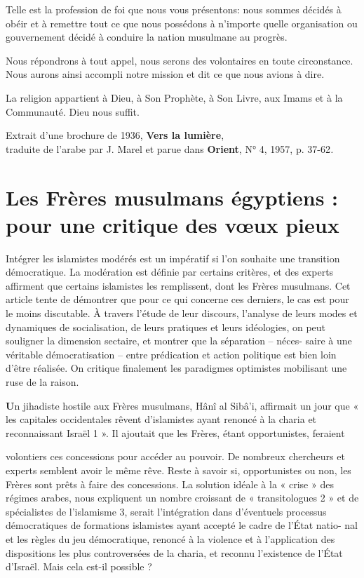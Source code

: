 Telle est la profession de foi que nous vous présentons: nous sommes
décidés à obéir et à remettre tout ce que nous possédons à n'importe
quelle organisation ou gouvernement décidé à conduire la nation
musulmane au progrès.

Nous répondrons à tout appel, nous serons des volontaires en toute
circonstance. Nous aurons ainsi accompli notre mission et dit ce que
nous avions à dire.

La religion appartient à Dieu, à Son Prophète, à Son Livre, aux Imams et
à la Communauté. Dieu nous suffit.

Extrait d'une brochure de 1936, \textbf{Vers la lumière},\\
traduite de l'arabe par J. Marel et parue dans \textbf{Orient}, N° 4,
1957, p. 37-62\emph{.}




\section{Les Frères musulmans égyptiens : pour une critique des vœux pieux}

 




Intégrer les islamistes modérés est un impératif si l'on souhaite une
transition démocratique. La modération est définie par certains
critères, et des experts affirment que certains islamistes les
remplissent, dont les Frères musulmans. Cet article tente de démontrer
que pour ce qui concerne ces derniers, le cas est pour le moins
discutable. À travers l'étude de leur discours, l'analyse de leurs modes
et dynamiques de socialisation, de leurs pratiques et leurs idéologies,
on peut souligner la dimension sectaire, et montrer que la séparation --
néces- saire à une véritable démocratisation -- entre prédication et
action politique est bien loin d'être réalisée. On critique finalement
les paradigmes optimistes mobilisant une ruse de la raison.

\textbf{U}n jihadiste hostile aux Frères musulmans, Hânî al Sibâ'i,
affirmait un jour que « les capitales occidentales rêvent d'islamistes
ayant renoncé à la charia et reconnaissant Israël 1 ». Il ajoutait que
les Frères, étant opportunistes, feraient

volontiers ces concessions pour accéder au pouvoir. De nombreux
chercheurs et experts semblent avoir le même rêve. Reste à savoir si,
opportunistes ou non, les Frères sont prêts à faire des concessions. La
solution idéale à la « crise » des régimes arabes, nous expliquent un
nombre croissant de « transitologues 2 » et
de spécialistes de l'islamisme 3, serait l'intégration dans d'éventuels
processus démocratiques de formations islamistes ayant accepté le cadre
de l'État natio- nal et les règles du jeu démocratique, renoncé à la
violence et à l'application des dispositions les plus controversées de
la charia, et reconnu l'existence de l'État d'Israël. Mais cela est-il
possible ?

